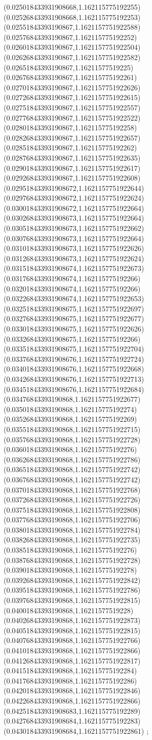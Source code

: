 {(0.025018433931908668,1.162115775192255)
(0.025268433931908668,1.162115775192253)
(0.02551843393190867,1.1621157751922588)
(0.02576843393190867,1.162115775192252)
(0.02601843393190867,1.1621157751922504)
(0.02626843393190867,1.1621157751922582)
(0.02651843393190867,1.16211577519225)
(0.02676843393190867,1.162115775192261)
(0.02701843393190867,1.1621157751922626)
(0.02726843393190867,1.1621157751922615)
(0.02751843393190867,1.1621157751922557)
(0.02776843393190867,1.1621157751922522)
(0.02801843393190867,1.162115775192258)
(0.02826843393190867,1.1621157751922657)
(0.02851843393190867,1.162115775192262)
(0.02876843393190867,1.1621157751922635)
(0.02901843393190867,1.1621157751922617)
(0.02926843393190867,1.1621157751922608)
(0.029518433931908672,1.1621157751922644)
(0.029768433931908672,1.1621157751922624)
(0.030018433931908672,1.1621157751922664)
(0.030268433931908673,1.1621157751922664)
(0.030518433931908673,1.1621157751922662)
(0.030768433931908673,1.1621157751922664)
(0.031018433931908673,1.1621157751922626)
(0.031268433931908673,1.1621157751922624)
(0.031518433931908674,1.1621157751922673)
(0.031768433931908674,1.162115775192266)
(0.032018433931908674,1.162115775192266)
(0.032268433931908674,1.1621157751922653)
(0.032518433931908675,1.1621157751922697)
(0.032768433931908675,1.1621157751922677)
(0.033018433931908675,1.1621157751922626)
(0.033268433931908675,1.162115775192266)
(0.033518433931908675,1.1621157751922704)
(0.033768433931908676,1.1621157751922724)
(0.034018433931908676,1.1621157751922668)
(0.034268433931908676,1.1621157751922713)
(0.034518433931908676,1.1621157751922684)
(0.03476843393190868,1.1621157751922677)
(0.03501843393190868,1.162115775192274)
(0.03526843393190868,1.162115775192269)
(0.03551843393190868,1.1621157751922715)
(0.03576843393190868,1.1621157751922728)
(0.03601843393190868,1.162115775192276)
(0.03626843393190868,1.1621157751922786)
(0.03651843393190868,1.1621157751922742)
(0.03676843393190868,1.1621157751922742)
(0.03701843393190868,1.1621157751922768)
(0.03726843393190868,1.1621157751922726)
(0.03751843393190868,1.1621157751922808)
(0.03776843393190868,1.1621157751922706)
(0.03801843393190868,1.1621157751922784)
(0.03826843393190868,1.1621157751922735)
(0.03851843393190868,1.162115775192276)
(0.03876843393190868,1.1621157751922728)
(0.03901843393190868,1.162115775192278)
(0.03926843393190868,1.1621157751922842)
(0.03951843393190868,1.1621157751922786)
(0.03976843393190868,1.1621157751922815)
(0.04001843393190868,1.16211577519228)
(0.04026843393190868,1.1621157751922873)
(0.04051843393190868,1.1621157751922815)
(0.04076843393190868,1.1621157751922766)
(0.04101843393190868,1.1621157751922866)
(0.04126843393190868,1.1621157751922817)
(0.04151843393190868,1.162115775192284)
(0.04176843393190868,1.162115775192286)
(0.04201843393190868,1.1621157751922846)
(0.04226843393190868,1.1621157751922866)
(0.042518433931908683,1.162115775192289)
(0.042768433931908684,1.162115775192283)
(0.043018433931908684,1.1621157751922861)
};
